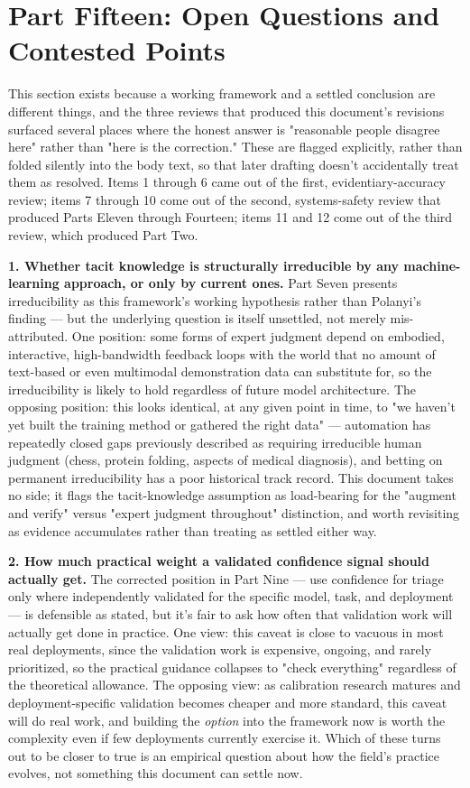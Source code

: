 \section{Part Fifteen: Open Questions and Contested Points}

This section exists because a working framework and a settled conclusion are different things, and the three reviews that produced this document's revisions surfaced several places where the honest answer is "reasonable people disagree here" rather than "here is the correction." These are flagged explicitly, rather than folded silently into the body text, so that later drafting doesn't accidentally treat them as resolved. Items 1 through 6 came out of the first, evidentiary-accuracy review; items 7 through 10 come out of the second, systems-safety review that produced Parts Eleven through Fourteen; items 11 and 12 come out of the third review, which produced Part Two.

\textbf{1. Whether tacit knowledge is structurally irreducible by any machine-learning approach, or only by current ones.} Part Seven presents irreducibility as this framework's working hypothesis rather than Polanyi's finding --- but the underlying question is itself unsettled, not merely mis-attributed. One position: some forms of expert judgment depend on embodied, interactive, high-bandwidth feedback loops with the world that no amount of text-based or even multimodal demonstration data can substitute for, so the irreducibility is likely to hold regardless of future model architecture. The opposing position: this looks identical, at any given point in time, to "we haven't yet built the training method or gathered the right data" --- automation has repeatedly closed gaps previously described as requiring irreducible human judgment (chess, protein folding, aspects of medical diagnosis), and betting on permanent irreducibility has a poor historical track record. This document takes no side; it flags the tacit-knowledge assumption as load-bearing for the "augment and verify" versus "expert judgment throughout" distinction, and worth revisiting as evidence accumulates rather than treating as settled either way.

\textbf{2. How much practical weight a validated confidence signal should actually get.} The corrected position in Part Nine --- use confidence for triage only where independently validated for the specific model, task, and deployment --- is defensible as stated, but it's fair to ask how often that validation work will actually get done in practice. One view: this caveat is close to vacuous in most real deployments, since the validation work is expensive, ongoing, and rarely prioritized, so the practical guidance collapses to "check everything" regardless of the theoretical allowance. The opposing view: as calibration research matures and deployment-specific validation becomes cheaper and more standard, this caveat will do real work, and building the \emph{option} into the framework now is worth the complexity even if few deployments currently exercise it. Which of these turns out to be closer to true is an empirical question about how the field's practice evolves, not something this document can settle now.

